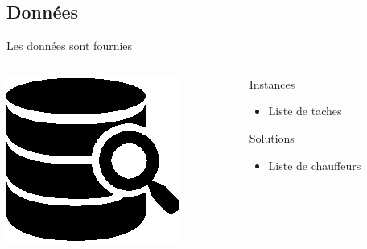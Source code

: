 \documentclass[xcolor=x11names,12pt,compress]{beamer}
\begin{document}
\subsection{Données}
\begin{frame}{Les données sont fournies}
    \begin{columns}
        \begin{column}{0.2\textwidth}
            \includegraphics{data.eps}
    \end{column}
        \begin{column}{0.5\textwidth}
    \begin{block}{Instances}
        \begin{itemize}
    	    \item Liste de taches
        \end{itemize}
    \end{block}
    \begin{block}{Solutions}
        \begin{itemize}
    	    \item Liste de chauffeurs
        \end{itemize}
    \end{block}
    \end{column}
    \end{columns}
\end{frame}
\end{document}
